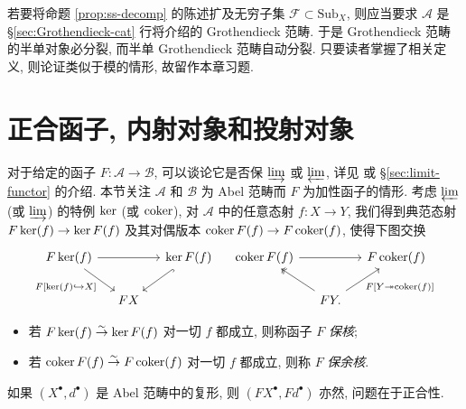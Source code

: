 \begin{remark}\label{rem:Grothendieck-ss-decomp}
	若要将命题 \ref{prop:ss-decomp} 的陈述扩及无穷子集 $\mathcal{F} \subset \mathrm{Sub}_X$, 则应当要求 $\mathcal{A}$ 是 \S\ref{sec:Grothendieck-cat} 行将介绍的 Grothendieck 范畴. 于是 Grothendieck 范畴的半单对象必分裂, 而半单 Grothendieck 范畴自动分裂. 只要读者掌握了相关定义, 则论证类似于模的情形, 故留作本章习题.
\end{remark}

\section{正合函子, 内射对象和投射对象}\label{sec:inj-proj}
对于给定的函子 $F: \mathcal{A} \to \mathcal{B}$, 可以谈论它是否保 $\varinjlim$ 或 $\varprojlim$, 详见 \cite[\S 2.8]{Li1} 或 \S\ref{sec:limit-functor} 的介绍. 本节关注 $\mathcal{A}$ 和 $\mathcal{B}$ 为 Abel 范畴而 $F$ 为加性函子的情形. 考虑 $\varprojlim$ (或 $\varinjlim$) 的特例 $\operatorname{ker}$ (或 $\operatorname{coker}$), 对 $\mathcal{A}$ 中的任意态射 $f: X \to Y$, 我们得到典范态射 $F \operatorname{ker}(f) \to \operatorname{ker} F(f)$ 及其对偶版本 $\operatorname{coker} F(f) \to F\operatorname{coker}(f)$, 使得下图交换
\[\begin{tikzcd}[column sep=small]
	F \Ker(f) \arrow[rd, "{F[\Ker(f) \hookrightarrow X]}"'] \arrow[rr] & & \Ker F(f) \arrow[hookrightarrow, ld] \\
	& FX &
\end{tikzcd} \quad \begin{tikzcd}[column sep=small]
	\Coker F(f) \arrow[rr] & & F \Coker(f) \\
	& FY \arrow[twoheadrightarrow, lu] \arrow[ru, "{ F[Y \twoheadrightarrow \Coker(f)] }"'] . &
\end{tikzcd}\]
\begin{itemize}
	\item 若 $F \operatorname{ker}(f) \stackrel{\sim}{\rightarrow} \operatorname{ker} F(f)$ 对一切 $f$ 都成立, 则称函子 $F$ \emph{保核};
	\item 若 $\operatorname{coker} F(f) \stackrel{\sim}{\rightarrow} F \operatorname{coker}(f)$ 对一切 $f$ 都成立, 则称 $F$ \emph{保余核}.
\end{itemize}

如果 $(X^\bullet, d^\bullet)$ 是 Abel 范畴中的复形, 则 $(FX^\bullet, Fd^\bullet)$ 亦然, 问题在于正合性.

